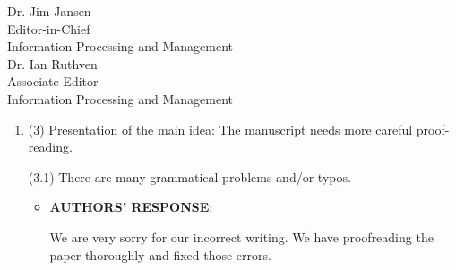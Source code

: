 \documentclass[11pt]{letter} %
\begin{document}
\begin{letter}{Dr. Jim Jansen \\
			Editor-in-Chief  \\
			Information Processing and Management\\
			Dr. Ian Ruthven \\
			Associate Editor \\
			Information Processing and Management}
\begin{enumerate}
\begin{itemize}
\begin{itemize}
				\item[-] ITA:  R-1 \textit{6.14e-34}, R-2 \textit{2.12e-48}, R-L \textit{5.67e-12} 

				\item[-] ITDA:  R-1 \textit{2.76e-32}, R-2 \textit{4.52e-44}, R-L \textit{3.94e-11}

				\item[-] COV:  R-1 \textit{4.14e-30}, R-2 \textit{4.61e-50}, R-L \textit{7.12e-12}

				\item[-] COVP:  R-1 \textit{2.51e-32}, R-2 \textit{3.17e-41}, R-L \textit{2.15e-10}

				\item[-] SCL:  R-1 \textit{3.11e-32}, R-2 \textit{3.29e-44}, R-L \textit{3.43e-15}
				
				\item[-] TRI: R-1 \textit{5.25e-30}, R-2 \textit{1.33e-43}, R-L \textit{3.67e-12}
				\end{itemize}
                
                The table about correlation are added in Section 4.4 (Table 12, page 26). 
				
				We revise:
				``We take Kruskal-Wallis test [43, 44] as our significance test to
				measure that the ROUGE scores are significant or not. As shown in Table 11, all
				p-values are less than 0.05.''
				
				to 
 
				`` We take t-test as our significance test to
				measure that the ROUGE scores between our proposed approach (ATTF+SBD) and each baseline
				are significant or not. As shown in Table 11, all
				p-values are less than 0.05.''(line 402-405, page 25)
			\end{itemize}
			\item 
			(3) Presentation of the main idea: The manuscript needs more careful proof-reading.

            (3.1) There are many grammatical problems and/or typos.
			\begin{itemize}
				\item[] \textbf{AUTHORS' RESPONSE}: 
				
				We are very sorry for our incorrect writing.
				We have proofreading the paper thoroughly and fixed those errors.


\end{itemize}
\end{enumerate}
\end{letter}
\end{document}
